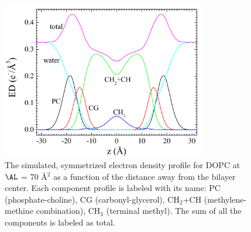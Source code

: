 \begin{figure}[htbp]
  \centering
  \includegraphics[width=0.8\textwidth]{figures/Tat/MD_Results/edp/dopc_70_PC-CG}
  \caption{The simulated, symmetrized electron density profile for DOPC at $\AL$ = 70 \AA$^2$ as 
  a function of the distance away from the bilayer center. 
  Each component profile is labeled with its name: PC (phosphate-choline),
  CG (carbonyl-glycerol), CH$_2$+CH (methylene-methine combination), 
  CH$_3$ (terminal methyl). The sum of all the components is labeled as total.}
  \label{fig:MD_dopc_70_PC-CG}
\end{figure}

